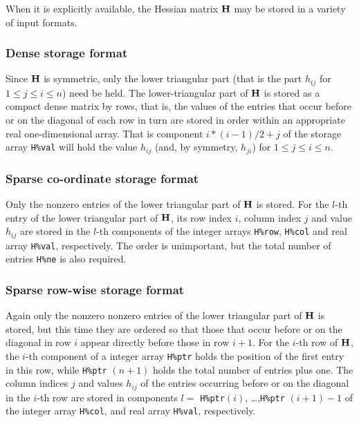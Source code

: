 \documentclass{galahad}
\begin{document}

\galmatrix
When it is explicitly available,  
the Hessian matrix ${\mathbf{H}}$ may be stored in a variety of input formats.

\subsubsection{Dense storage format}\label{dense}
Since ${\mathbf{H}}$ is symmetric, only the lower triangular part (that is the part 
$h_{ij}$ for $1 \leq j \leq i \leq n$) need be held. 
The lower-triangular part of ${\mathbf{H}}$ is stored as a compact 
dense matrix by rows, that is, the values of the entries that occur before
or on the diagonal of each row in turn are
stored in order within an appropriate real one-dimensional array.
That is component $i \ast (i-1)/2 + j$ of the storage array {\tt H\%val}  
will hold the value $h_{ij}$ (and, by symmetry, $h_{ji}$)
for $1 \leq j \leq i \leq n$.

\subsubsection{Sparse co-ordinate storage format}\label{coordinate}
Only the nonzero entries of the lower triangular part of ${\mathbf{H}}$ is stored. 
For the $l$-th entry of the lower triangular part of ${\mathbf{H}}$, 
its row index $i$, column index $j$ and value $h_{ij}$
are stored in the $l$-th components of the integer arrays {\tt H\%row}, 
{\tt H\%col} and real array {\tt H\%val}, respectively.
The order is unimportant, but the total
number of entries {\tt H\%ne} is also required. 

\subsubsection{Sparse row-wise storage format}\label{rowwise}
Again only the nonzero nonzero entries of the lower triangular 
part of ${\mathbf{H}}$ is stored, but this time they are ordered so that those 
that occur before or on the diagonal in row $i$ appear directly before those
in row $i+1$. For the $i$-th row of ${\mathbf{H}}$, the $i$-th component of a 
integer array {\tt H\%ptr} holds the position of the first entry in this row,
while {\tt H\%ptr} $(n+1)$ holds the total number of entries plus one.
The column indices $j$ and values $h_{ij}$ of the entries 
occurring before or on the diagonal in the $i$-th row are stored in components 
$l =$ {\tt H\%ptr}$(i)$, \ldots ,{\tt H\%ptr} $(i+1)-1$ of the 
integer array {\tt H\%col}, and real array {\tt H\%val}, respectively. 
\end{document}
